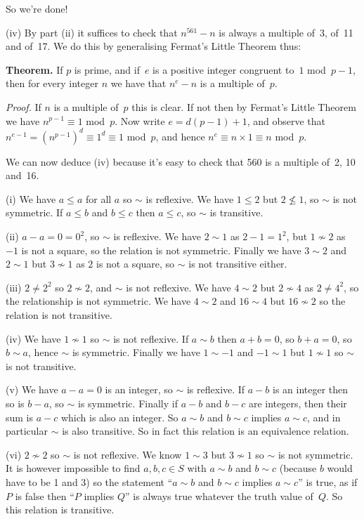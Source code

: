 \documentclass[10pt]{article}
\begin{document}
So we're done!

(iv) By part (ii) it suffices to check that $n^{561}-n$ is always a multiple of~3, of~11 and of~17. We do this by generalising Fermat's Little Theorem thus:

{\bf Theorem.} If $p$ is prime, and if~$e$ is a positive integer congruent to~$1$ mod~$p-1$, then for every integer $n$ we have that $n^e-n$ is a multiple of~$p$.

{\it Proof.} If $n$ is a multiple of~$p$ this is clear. If not then by Fermat's Little Theorem we have $n^{p-1}\equiv1$ mod~$p$. Now write $e=d(p-1)+1$, and observe that $n^{e-1}=(n^{p-1})^d\equiv 1^d\equiv1$ mod~$p$, and hence $n^e\equiv n\times 1\equiv n$ mod~$p$.

We can now deduce (iv) because it's easy to check that 560 is a multiple of~2, 10 and~16.

\medskip{} 

(i) We have $a\leq a$ for all $a$ so $\sim$ is reflexive. We have $1\leq 2$ but $2\not\leq 1$, so $\sim$ is not symmetric. If $a\leq b$ and $b\leq c$ then $a\leq c$, so $\sim$ is transitive.

(ii) $a-a=0=0^2$, so $\sim$ is reflexive. We have $2\sim 1$ as $2-1=1^2$, but $1\not\sim 2$ as $-1$ is not a square, so the relation is not symmetric. Finally we have $3\sim 2$ and $2\sim 1$ but $3\not\sim 1$ as $2$ is not a square, so $\sim$ is not transitive either.

(iii) $2\not=2^2$ so $2\not\sim 2$, and $\sim$ is not reflexive. We have $4\sim 2$ but $2\not\sim 4$ as $2\not=4^2$, so the relationship is not symmetric. We have $4\sim 2$ and $16\sim 4$ but $16\not\sim 2$ so the relation is not transitive.

(iv) We have $1\not\sim 1$ so $\sim$ is not reflexive. If $a\sim b$ then $a+b=0$, so $b+a=0$, so $b\sim a$, hence $\sim$ is symmetric. Finally we have $1\sim-1$ and $-1\sim 1$ but $1\not\sim 1$ so $\sim$ is not transitive.

(v) We have $a-a=0$ is an integer, so $\sim$ is reflexive. If $a-b$ is an integer then so is $b-a$, so $\sim$ is symmetric. Finally if $a-b$ and $b-c$ are integers, then their sum is $a-c$ which is also an integer. So $a\sim b$ and $b\sim c$ implies $a\sim c$, and in particular $\sim$ is also transitive. So in fact this relation is an equivalence relation.

(vi) $2\not\sim 2$ so $\sim$ is not reflexive. We know $1\sim 3$ but $3\not\sim 1$ so $\sim$ is not symmetric. It is however impossible to find $a,b,c\in S$ with $a\sim b$ and $b\sim c$ (because $b$ would have to be 1 and 3) so the statement ``$a\sim b$ and $b\sim c$ implies $a\sim c$'' is true, as if $P$ is false then ``$P$ implies $Q$'' is always true whatever the truth value of~$Q$. So this relation is transitive.
\end{document}
